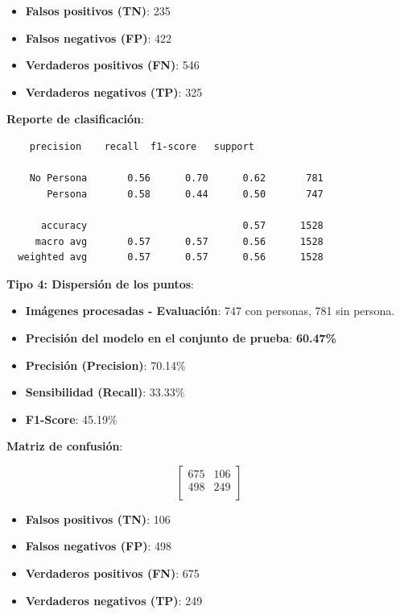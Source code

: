 \documentclass[a4paper]{article}
\begin{document}
\begin{itemize}
    \item \textbf{Falsos positivos (TN)}: 235
    \item \textbf{Falsos negativos (FP)}: 422
    \item \textbf{Verdaderos positivos (FN)}: 546
    \item \textbf{Verdaderos negativos (TP)}: 325
\end{itemize}

\textbf{Reporte de clasificación}:

\begin{verbatim}
    precision    recall  f1-score   support

    No Persona       0.56      0.70      0.62       781
       Persona       0.58      0.44      0.50       747
  
      accuracy                           0.57      1528
     macro avg       0.57      0.57      0.56      1528
  weighted avg       0.57      0.57      0.56      1528
\end{verbatim}

\vspace{0.5cm}

\textbf{Tipo 4: Dispersión de los puntos}:

\begin{itemize}
    \item \textbf{Imágenes procesadas - Evaluación}: 747 con personas, 781 sin persona.
    \item \textbf{Precisión del modelo en el conjunto de prueba}: \textbf{60.47\%}
    \item \textbf{Precisión (Precision)}: 70.14\%
    \item \textbf{Sensibilidad (Recall)}: 33.33\%
    \item \textbf{F1-Score}: 45.19\%
\end{itemize}

\textbf{Matriz de confusión}:

\[
\begin{bmatrix}
    675 & 106 \\
    498 & 249 \\
\end{bmatrix}
\]

\begin{itemize}
    \item \textbf{Falsos positivos (TN)}: 106
    \item \textbf{Falsos negativos (FP)}: 498
    \item \textbf{Verdaderos positivos (FN)}: 675
    \item \textbf{Verdaderos negativos (TP)}: 249
\end{itemize}
\end{document}
